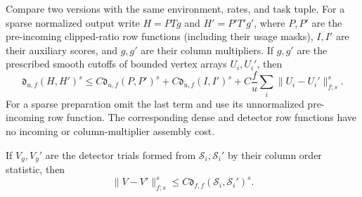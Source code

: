\begin{lemma}
\label{lem:atom-assembly}
Compare two versions with the same environment, rates, and task tuple.
For a sparse normalized output write $H=P T g$ and
$H'=P'T'g'$, where $P,P'$ are the pre-incoming clipped-ratio row
functions (including their usage masks), $I,I'$ are their auxiliary
scores, and $g,g'$ are their column multipliers.  If $g,g'$ are the
prescribed smooth cutoffs of bounded vertex arrays $U_i,U_i'$, then
\begin{equation}
 \mathfrak d_{u,f}(H,H')^s
 \le C\mathfrak d_{u,f}(P,P')^s
    +C\mathfrak d_{u,f}(I,I')^s
    +C\frac fu\sum_i\|U_i-U_i'\|_{f;s}^s.
 \label{eq:atom-assembly-bound}
\end{equation}
For a sparse preparation omit the last term and use its unnormalized
pre-incoming row function.  The corresponding dense and detector row
functions have no incoming or column-multiplier assembly cost.

If $V_y,V_y'$ are the detector trials formed from
$\mathcal S_i,\mathcal S_i'$ by their column order statistic, then
\begin{equation}
 \|V-V'\|_{f;s}^s
   \le C\mathfrak d_{f,f}(\mathcal S_i,\mathcal S_i')^s.
 \label{eq:atom-detector-comparison}
\end{equation}
\end{lemma}

